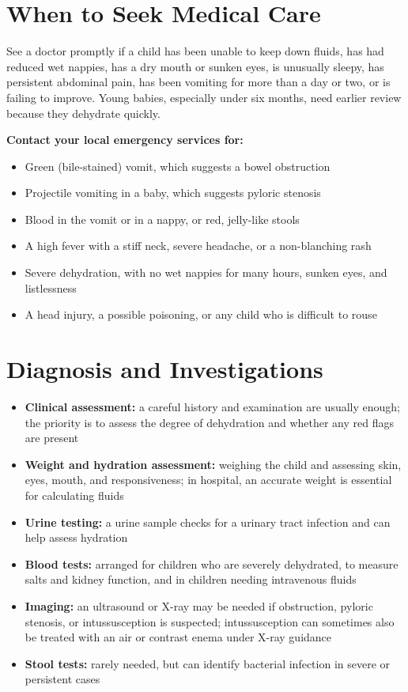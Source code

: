 \section*{When to Seek Medical Care}
See a doctor promptly if a child has been unable to keep down fluids, has had reduced wet nappies, has a dry mouth or sunken eyes, is unusually sleepy, has persistent abdominal pain, has been vomiting for more than a day or two, or is failing to improve. Young babies, especially under six months, need earlier review because they dehydrate quickly.

\textbf{Contact your local emergency services for:}
\begin{itemize}
    \item Green (bile-stained) vomit, which suggests a bowel obstruction
    \item Projectile vomiting in a baby, which suggests pyloric stenosis
    \item Blood in the vomit or in a nappy, or red, jelly-like stools
    \item A high fever with a stiff neck, severe headache, or a non-blanching rash
    \item Severe dehydration, with no wet nappies for many hours, sunken eyes, and listlessness
    \item A head injury, a possible poisoning, or any child who is difficult to rouse
\end{itemize}

\section*{Diagnosis and Investigations}
\begin{itemize}
    \item \textbf{Clinical assessment:} a careful history and examination are usually enough; the priority is to assess the degree of dehydration and whether any red flags are present
    \item \textbf{Weight and hydration assessment:} weighing the child and assessing skin, eyes, mouth, and responsiveness; in hospital, an accurate weight is essential for calculating fluids
    \item \textbf{Urine testing:} a urine sample checks for a urinary tract infection and can help assess hydration
    \item \textbf{Blood tests:} arranged for children who are severely dehydrated, to measure salts and kidney function, and in children needing intravenous fluids
    \item \textbf{Imaging:} an ultrasound or X-ray may be needed if obstruction, pyloric stenosis, or intussusception is suspected; intussusception can sometimes also be treated with an air or contrast enema under X-ray guidance
    \item \textbf{Stool tests:} rarely needed, but can identify bacterial infection in severe or persistent cases
\end{itemize}

